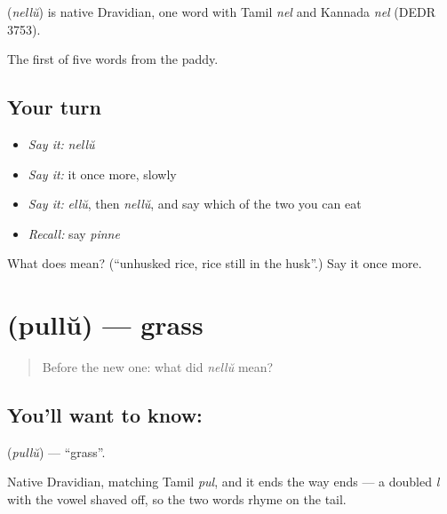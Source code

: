 \begin{cousinweb}
\textbf{} (\emph{nellŭ}) is native Dravidian, one word with Tamil \emph{nel} and Kannada \emph{nel} (DEDR 3753).
\end{cousinweb}

\begin{grammarlens}[title={What you've built}]
The first of five words from the paddy.
\end{grammarlens}

\subsection*{Your turn}
\begin{itemize}
\raggedright
  \item \emph{Say it:} \emph{nellŭ}
  \item \emph{Say it:} it once more, slowly
  \item \emph{Say it:} \emph{ellŭ}, then \emph{nellŭ}, and say which of the two you can eat
  \item \emph{Recall:} say \emph{pinne}
\end{itemize}

\begin{tcolorbox}[breakable,colback=teal!4,colframe=teal!35!black,title={Before you move on}]
What does  mean? (\textquotedblleft{}unhusked rice, rice still in the husk\textquotedblright{}.) Say it once more.
\end{tcolorbox}
\section[\texorpdfstring{\ml{പുല്ല്} (pullŭ)}{പുല്ല് (pullŭ)}]{ (pullŭ) — grass}

\label{lesson:ML-C66-grass}



\begin{quote}
Before the new one: what did \emph{nellŭ} mean?
\end{quote}

\subsection*{You'll want to know: }
\textbf{} (\emph{pullŭ}) — \textquotedblleft{}grass\textquotedblright{}.

Native Dravidian, matching Tamil \emph{pul}, and it ends the way  ends — a doubled \emph{l} with the vowel shaved off, so the two words rhyme on the tail.

